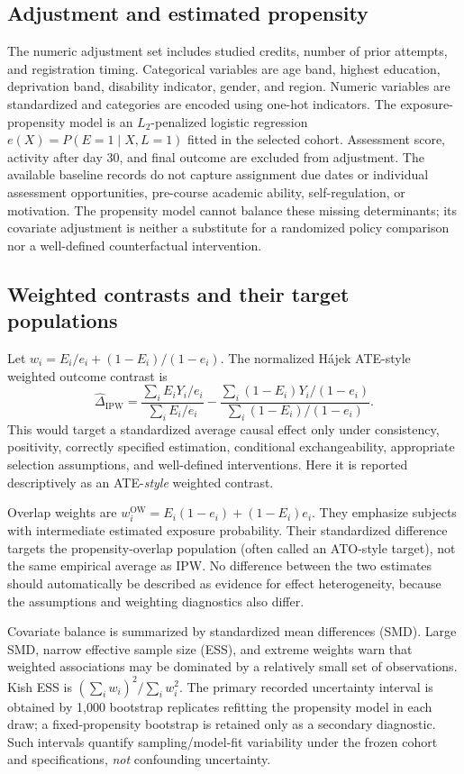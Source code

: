 \documentclass[10pt,a4paper]{article}
\begin{document}
\subsection{Adjustment and estimated propensity}
The numeric adjustment set includes studied credits, number of prior attempts, and registration timing. Categorical variables are age band, highest education, deprivation band, disability indicator, gender, and region. Numeric variables are standardized and categories are encoded using one-hot indicators. The exposure-propensity model is an $L_2$-penalized logistic regression $e(X)=P(E=1\mid X,L=1)$ fitted in the selected cohort. Assessment score, activity after day 30, and final outcome are excluded from adjustment. The available baseline records do not capture assignment due dates or individual assessment opportunities, pre-course academic ability, self-regulation, or motivation. The propensity model cannot balance these missing determinants; its covariate adjustment is neither a substitute for a randomized policy comparison nor a well-defined counterfactual intervention.

\subsection{Weighted contrasts and their target populations}
Let $w_i=E_i/e_i+(1-E_i)/(1-e_i)$. The normalized H\'ajek ATE-style weighted outcome contrast is
\begin{equation}
\widehat\Delta_{\mathrm{IPW}}=\frac{\sum_i E_iY_i/e_i}{\sum_i E_i/e_i}-\frac{\sum_i(1-E_i)Y_i/(1-e_i)}{\sum_i(1-E_i)/(1-e_i)}.
\end{equation}
This would target a standardized average causal effect only under consistency, positivity, correctly specified estimation, conditional exchangeability, appropriate selection assumptions, and well-defined interventions. Here it is reported descriptively as an ATE-\emph{style} weighted contrast.

Overlap weights are $w_i^{\mathrm{OW}}=E_i(1-e_i)+(1-E_i)e_i$. They emphasize subjects with intermediate estimated exposure probability. Their standardized difference targets the propensity-overlap population (often called an ATO-style target), not the same empirical average as IPW. No difference between the two estimates should automatically be described as evidence for effect heterogeneity, because the assumptions and weighting diagnostics also differ.

Covariate balance is summarized by standardized mean differences (SMD). Large SMD, narrow effective sample size (ESS), and extreme weights warn that weighted associations may be dominated by a relatively small set of observations. Kish ESS is $(\sum_i w_i)^2/\sum_i w_i^2$. The primary recorded uncertainty interval is obtained by 1,000 bootstrap replicates refitting the propensity model in each draw; a fixed-propensity bootstrap is retained only as a secondary diagnostic. Such intervals quantify sampling/model-fit variability under the frozen cohort and specifications, \emph{not} confounding uncertainty.
\end{document}
